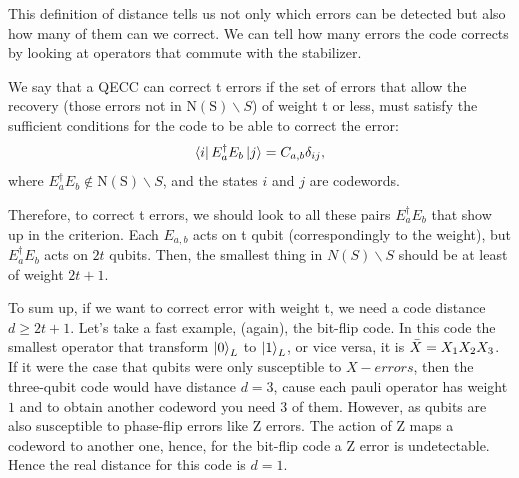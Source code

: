 This definition of distance tells us not only which errors can be detected but also how many of them can we correct. 
We can tell how many errors the code corrects by looking at operators that commute with the stabilizer. 



We say that a QECC can correct t errors if the set of errors that allow the recovery (those errors not in $\mathrm{N}(\mathrm{S}) \backslash S$) of weight t or less, must satisfy the sufficient conditions for the code to be able to correct the error: 
\begin{equation*}
    \bra{i} E_a^{\dagger}E_b \ket{j} = C_{a,b}\delta_{ij},
\end{equation*}
where $E_a^{\dagger}E_b \notin \mathrm{N}(\mathrm{S}) \backslash S$, and the states $i$ and $j$ are codewords.

Therefore, to correct t errors, we should look to all these pairs $E_a^\dagger E_b$ that show up in the criterion. Each $E_{a,b}$ acts on t qubit (correspondingly to the weight), but $E_a^\dagger E_b$ acts on $2t$ qubits. Then, the smallest thing in $N(S)\backslash S$ should be at least of weight $2t +1$. 


To sum up, if we want to correct error with  weight t, we need a code distance $d \ge 2t+1$.
Let's take a fast example, (again), the bit-flip code. 
In this code the smallest operator that transform $\ket{0}_L$ to $\ket{1}_L$, or vice versa, it
is $\Bar{X}=X_1X_2X_3$. 
If it were the case that qubits were only susceptible to $X-errors$, then the three-qubit code would have distance $d = 3$, cause each pauli operator has weight $1$
and to obtain another codeword you need 3 of them. 
However, as qubits are also susceptible to phase-flip errors like Z errors. The action of Z maps a codeword to another one, hence, for the bit-flip code a Z error is undetectable. Hence the real distance for this code is $d=1$. 



%




